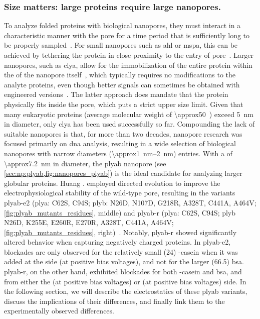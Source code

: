 \subsubsection{Size matters: large proteins require large nanopores.}
%

To analyze folded proteins with biological nanopores, they must interact in a characteristic manner with the
pore for a time period that is sufficiently long to be properly sampled~\cite{Willems-VanMeervelt-2017}. For
small nanopores such as \gls{ahl} or \gls{mspa}, this can be achieved by tethering the protein in close
proximity to the entry of pore~\cite{Movileanu-2000,Fahie-2015,Ho-2015,Laszlo-2016,Thakur-2019}. Larger
nanopores, such as \gls{clya}, allow for the immobilization of the entire protein within the \lumen{} of the
nanopore
itself~\cite{Soskine-2012,Soskine-2013,Soskine-Biesemans-2015,Biesemans-2015,Wloka-2016,VanMeervelt-2017,Galenkamp-2018,Galenkamp-2020},
which typically requires no modifications to the analyte proteins, even though better signals can sometimes be
obtained with engineered versions~\cite{Soskine-Biesemans-2015,Galenkamp-2020}. The latter approach does
mandate that the protein physically fits inside the pore, which puts a strict upper size limit. Given that
many eukaryotic proteins (average molecular weight of \SI{\approx50}{\kDa}~\cite{Kozlowski-2016}) exceed
\SI{5}{\nm} in diameter, only \gls{clya} has been used successfully so far. Compounding the lack of suitable
nanopores is that, for more than two decades, nanopore research was focused primarily on \gls{dna} analysis,
resulting in a wide selection of biological nanopores with narrow diameters (\SIrange{\approx1}{2}{\nm})
entries. With a \lumen{} of \SI{\approx7.2}{\nm} in diameter, the \gls{plyab} nanopore (see
\cref{sec:np:plyab,fig:nanopores_plyab}) is the ideal candidate for analyzing larger globular proteins. Huang
\etal. employed directed evolution to improve the electrophysiological stability of the wild-type pore,
resulting in the variants \gls{plyab-e2} (\gls{plya}: C62S, C94S; \gls{plyb}: N26D, N107D, G218R, A328T,
C441A, A464V; \cref{fig:plyab_mutants_residues}, middle) and \gls{plyab-r} (\gls{plya}: C62S, C94S; \gls{plyb}
N26D, K255E, E260R, E270R, A328T, C441A, A464V; \cref{fig:plyab_mutants_residues}, right)~\cite{Huang-2020}.
Notably, \gls{plyab-r} showed significantly altered behavior when capturing negatively charged proteins. In
\gls{plyab-e2}, blockades are only observed for the relatively small (\SI{24}{\kDa}) \tb-casein when it was
added at the \transi{} side (at positive bias voltages), and not for the larger (\SI{66.5}{\kDa}) \gls{bsa}.
\gls{plyab-r}, on the other hand, exhibited blockades for both \tb-casein and \gls{bsa}, and from either the
\cisi{} (at positive bias voltages) or \transi{} (at positive bias voltages) side. In the following section, we
will describe the electrostatics of these \gls{plyab} variants, discuss the implications of their differences,
and finally link them to the experimentally observed differences.


